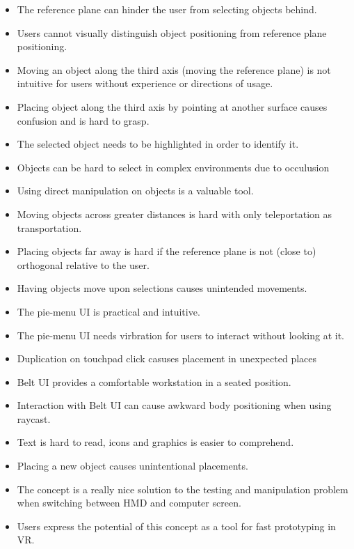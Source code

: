 \begin{itemize}

  \item The reference plane can hinder the user from selecting objects behind.
  \item Users cannot visually distinguish object positioning from reference plane positioning.
  \item Moving an object along the third axis (moving the reference plane) is not intuitive for users without experience or directions of usage.
  \item Placing object along the third axis by pointing at another surface causes confusion and is hard to grasp.

  \item The selected object needs to be highlighted in order to identify it.
  \item Objects can be hard to select in complex environments due to occulusion
  \item Using direct manipulation on objects is a valuable tool.
  \item Moving objects across greater distances is hard with only teleportation as transportation.
  \item Placing objects far away is hard if the reference plane is not (close to) orthogonal relative to the user.
  \item Having objects move upon selections causes unintended movements.

  \item The pie-menu UI is practical and intuitive.
  \item The pie-menu UI needs virbration for users to interact without looking at it.
  \item Duplication on touchpad click casuses placement in unexpected places

  \item Belt UI provides a comfortable workstation in a seated position.
  \item Interaction with Belt UI can cause awkward body positioning when using raycast.
  \item Text is hard to read, icons and graphics is easier to comprehend.
  \item Placing a new object causes unintentional placements. 

  \item The concept is a really nice solution to the testing and manipulation problem when switching between HMD and computer screen.
  \item Users express the potential of this concept as a tool for fast prototyping in VR.

\end{itemize}

